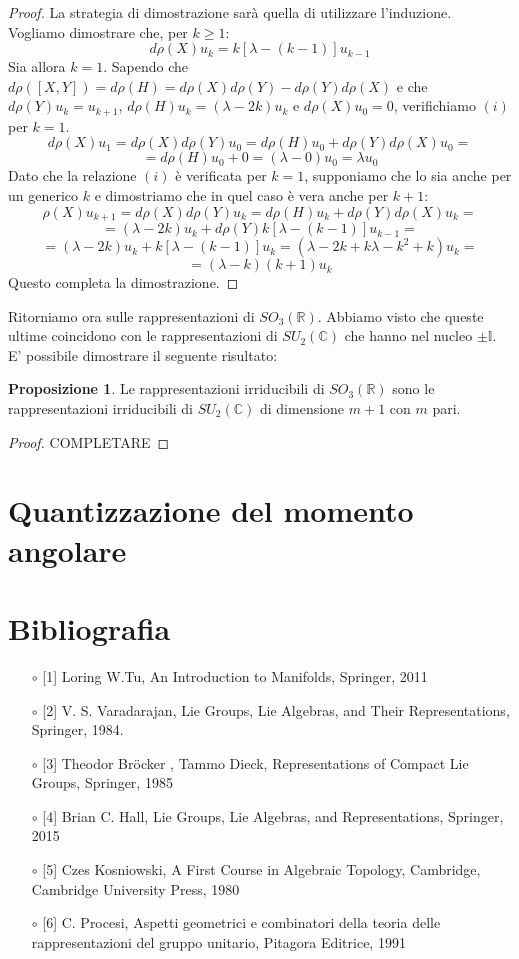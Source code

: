 \documentclass[12pt,a4paper]{report}
\theoremstyle{definition}
\newtheorem{Prop}[Def]{Proposizione}
\theoremstyle{definition}
\theoremstyle{definition}
\theoremstyle{definition}
\begin{document}
\begin{proof}
	La strategia di dimostrazione sarà quella di utilizzare l'induzione.
	Vogliamo dimostrare che, per $k\geq 1$:
	\begin{equation}
		\label{eq:4}
		d\rho(X)u_k=k[\lambda-(k-1)]u_{k-1} 
\tag{i}
\end{equation}
	Sia allora $k=1$. Sapendo che $d\rho([X,Y])=d\rho(H)=d\rho(X)d\rho(Y)-d\rho(Y)d\rho(X)$ e che $d\rho(Y)u_k=u_{k+1}$, $d\rho(H)u_k=(\lambda-2k)u_k$ e $d\rho(X)u_0=0$, verifichiamo $(i)$ per $k=1$.
	$$d\rho(X)u_1=d\rho(X)d\rho(Y)u_0=d\rho(H)u_0+d\rho(Y)d\rho(X)u_0=$$$$=d\rho(H)u_0+0=(\lambda-0)u_0=\lambda u_0$$
	Dato che la relazione $(i)$ è verificata per $k=1$, supponiamo che lo sia anche per un generico $k$ e dimostriamo che in quel caso è vera anche per $k+1$:
	$$\rho(X)u_{k+1}=d\rho(X)d\rho(Y)u_{k}=d\rho(H)u_k+d\rho(Y)d\rho(X)u_k=$$
	$$=(\lambda-2k)u_k+d\rho(Y)k[\lambda-(k-1)]u_{k-1}=$$ 
	$$=(\lambda-2k)u_k+k[\lambda-(k-1)]u_{k}=(\lambda-2k+k\lambda-k^2+k)u_k=$$
	$$=(\lambda-k)(k+1)u_k$$
	Questo completa la dimostrazione.
\end{proof}
Ritorniamo ora sulle rappresentazioni di $SO_3(\mathbb{R})$. Abbiamo visto che queste ultime coincidono con le rappresentazioni di $SU_2(\mathbb{C})$ che hanno nel nucleo $\pm\mathbb{I}$. E' possibile dimostrare il seguente risultato:
\begin{Prop}
	Le rappresentazioni irriducibili di $SO_3(\mathbb{R})$ sono le rappresentazioni irriducibili di $SU_2(\mathbb{C})$ di dimensione $m+1$ con $m$ pari.
\end{Prop}
\begin{proof}
	COMPLETARE
\end{proof}
\chapter{Quantizzazione del momento angolare}
\chapter*{Bibliografia}
\begin{itemize}
	\item[$\circ$] [1] Loring W.Tu, An Introduction to Manifolds, Springer, 2011
	\item[$\circ$] [2] V. S. Varadarajan, Lie Groups, Lie Algebras, and Their Representations, Springer,
	1984.
	\item[$\circ$] [3] Theodor Bröcker , Tammo Dieck, Representations of Compact Lie Groups, Springer, 1985
	\item[$\circ$] [4] Brian C. Hall, Lie Groups, Lie Algebras, and Representations, Springer, 2015
	\item [$\circ$] [5] Czes Kosniowski, A First Course in Algebraic Topology, Cambridge, Cambridge University Press, 1980
	\item [$\circ$] [6] C. Procesi, Aspetti geometrici e combinatori della teoria delle rappresentazioni del gruppo unitario, Pitagora Editrice, 1991
\end{itemize}
\end{document}
